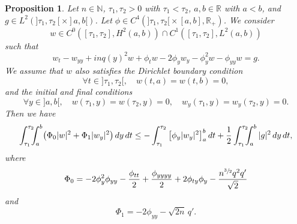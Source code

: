 \documentclass[10pt]{amsart}
\theoremstyle{plain}
\newtheorem{proposition}[theorem]{Proposition}
\theoremstyle{definition}
\newcommand{\abs}[1]{\vert #1\vert}
\newcommand{\1}{\mathds 1}
\newcommand{\R}{\mathbb{R}}
\newcommand{\N}{\mathbb{N}}
\begin{document}
\begin{proposition} \label{prop-Carleman}
Let $n \in \N$, $\tau_1,\tau_2 > 0$ with $\tau_1<\tau_2$, $a,b \in \R$ with $a < b$, and $g \in L^2 (]\tau_1,\tau_2[\times{}]a,b[)$. Let $\phi \in C^4(]\tau_1,\tau_2[{}\times [a,b],\R_+)$. We consider
\[
w \in C^0([\tau_1,\tau_2],H^2(a,b)) \cap C^1([\tau_1,\tau_2],L^2(a,b))
\]
such that
\begin{equation} \label{eq-w}
w_t - w_{yy} + inq(y)^2 w + \phi_t w - 2 \phi_y w_y - \phi_y^2 w - \phi_{yy} w = g.
\end{equation}
We assume that $w$ also satisfies the Dirichlet boundary condition
\begin{equation} \label{eq-w-Dir}
\forall t \in{}]\tau_1,\tau_2[, \quad w(t,a) = w(t,b) = 0,
\end{equation}
and the initial and final conditions
\begin{equation} \label{eq-w-0T}
\forall y \in{}]a,b[, \quad w(\tau_1,y) = w(\tau_2,y) = 0, \quad w_y(\tau_1,y) = w_y(\tau_2,y) = 0.
\end{equation}
Then we have
\begin{equation*}
\int_{\tau_1}^{\tau_2} \hspace*{-2mm}\int_a^b \bigl(\Phi_0 \abs w^2 + \Phi_1 \abs{w_y}^2 \bigr) \, dy \, dt
\leq - \int_{\tau_1}^{\tau_2} \big[ \phi_y \abs{w_y}^2 \big]_a^b \, dt + \frac 1 2 \int_{\tau_1}^{\tau_2}\hspace*{-2mm} \int_a^b \abs{g}^2 \, dy \, dt ,
\end{equation*}
where
\begin{equation} \label{def-Phi0}
\Phi_0 = - 2 \phi_y^2 \phi_{yy} - \frac {\phi_{tt}}{2} + \frac {\phi_{yyyy}}{2} + 2\phi_{ty} \phi_{y} - \frac {n^{\sfrac{3}{2}}q^2 q'}{\sqrt 2}
\end{equation}
and
\begin{equation} \label{def-Phi1}
\Phi_1 = - 2 \phi_{yy} - \sqrt {2n}\, q'.
\end{equation}
\end{proposition}
\end{document}

